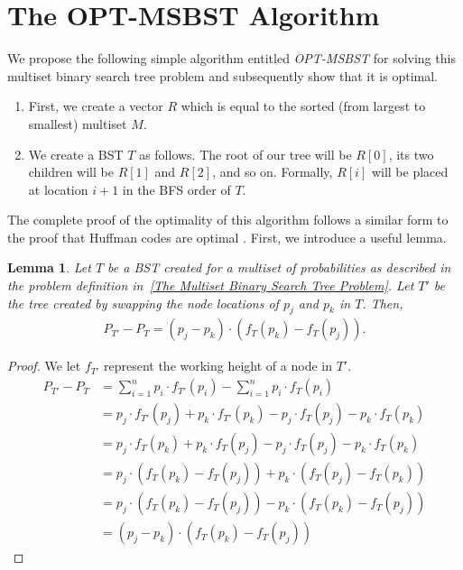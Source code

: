 \documentclass[letterpaper,12pt,titlepage,oneside,final]{book}
\theoremstyle{plain}
\newtheorem{lem}[thm]{Lemma}
\begin{document}
\section{The OPT-MSBST Algorithm}\label{OPT-MSBST}

We propose the following simple algorithm entitled \textit{OPT-MSBST} for solving this multiset binary search tree problem and subsequently show that it is optimal.

\begin{enumerate}
\item First, we create a vector $R$ which is equal to the sorted (from largest to smallest) multiset $M$.

\item We create a BST $T$ as follows. The root of our tree will be $R[0]$, its two children will be $R[1]$ and $R[2]$, and so on. Formally, $R[i]$ will be placed at location $i+1$ in the BFS order of $T$.
\end{enumerate}

The complete proof of the optimality of this algorithm follows a similar form to the proof that Huffman codes are optimal \cite{huffman1952method}. First, we introduce a useful lemma.

\begin{lem}\label{MS Swap Lemma}
Let $T$ be a BST created for a multiset of probabilities as described in the problem definition in~\ref{The Multiset Binary Search Tree Problem}. Let $T'$ be the tree created by swapping the node locations of $p_j$ and $p_k$ in $T$. Then,
\begin{align*}
P_{T'}-P_T = (p_j - p_k)\cdot (f_T(p_k)-f_T(p_j)).
\end{align*}
\end{lem}

\begin{proof}
We let $f_{T'}$ represent the working height of a node in $T'$.
\begin{align*}
P_{T'}-P_T &= \sum_{i=1}^{n} p_i\cdot f_{T'}(p_i) - \sum_{i=1}^{n} p_i\cdot f_T(p_i) \\
&= p_j\cdot f_{T'}(p_j)+p_k\cdot f_{T'}(p_k) - p_j\cdot f_T(p_j) - p_k\cdot f_T(p_k)\\
&= p_j\cdot f_T(p_k)+p_k\cdot f_T(p_j) - p_j\cdot f_T(p_j) - p_k\cdot f_T(p_k)\\
&= p_j\cdot (f_T(p_k)-f_T(p_j)) + p_k \cdot (f_T(p_j) - f_T(p_k))\\
&= p_j\cdot (f_T(p_k)-f_T(p_j)) - p_k \cdot (f_T(p_k)-f_T(p_j))\\
&= (p_j - p_k)\cdot (f_T(p_k)-f_T(p_j))
\end{align*}

\end{proof}
\end{document}
